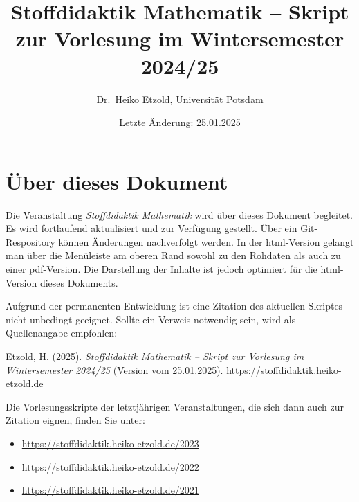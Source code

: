 \documentclass[
]{scrbook}
\title{Stoffdidaktik Mathematik -- Skript zur Vorlesung im Wintersemester 2024/25}
\author{Dr.~Heiko Etzold, Universität Potsdam}
\date{Letzte Änderung: 25.01.2025}
\makeatletter
\providecommand{\tightlist}{%
  \setlength{\itemsep}{0pt}\setlength{\parskip}{0pt}}
\renewenvironment{quote}{
  \list{}{
	\leftmargin0.2cm   %
    \rightmargin\leftmargin
      	\def\FrameCommand
    {%
        {\color{quoteColor}\vrule width 2pt}%
        \hspace{0pt}%
    }%
    \MakeFramed{\advance \hsize -\width \FrameRestore}    \color{quoteColor}
    }
  \item\relax
}
{\endlist\color{black}\endMakeFramed}
\def\renewtheorem#1{%
  \expandafter\let\csname#1\endcsname\relax
  \expandafter\let\csname c@#1\endcsname\relax
  \gdef\renewtheorem@envname{#1}
  \renewtheorem@secpar
}
\def\renewtheorem@secpar{\@ifnextchar[{\renewtheorem@numberedlike}{\renewtheorem@nonumberedlike}}
\def\renewtheorem@numberedlike[#1]#2{\newtheorem{\renewtheorem@envname}[#1]{#2}}
\def\renewtheorem@nonumberedlike#1{
\def\renewtheorem@caption{#1}
\edef\renewtheorem@nowithin{\noexpand\newtheorem{\renewtheorem@envname}{\renewtheorem@caption}}
\renewtheorem@thirdpar
}
\def\renewtheorem@thirdpar{\@ifnextchar[{\renewtheorem@within}{\renewtheorem@nowithin}}
\def\renewtheorem@within[#1]{\renewtheorem@nowithin[#1]}
\theoremstyle{definition}
\theoremstyle{definition}
\theoremstyle{definition}
\theoremstyle{definition}
\theoremstyle{remark}
\makeatother
\begin{document}
\maketitle

%

{
\hypersetup{linkcolor=}
\setcounter{tocdepth}{1}
\tableofcontents
}
\chapter*{Über dieses Dokument}\label{uxfcber-dieses-dokument}

Die Veranstaltung \emph{Stoffdidaktik Mathematik} wird über dieses Dokument begleitet. Es wird fortlaufend aktualisiert und zur Verfügung gestellt. Über ein Git-Respository können Änderungen nachverfolgt werden.
In der html-Version gelangt man über die Menüleiste am oberen Rand sowohl zu den Rohdaten als auch zu einer pdf-Version. Die Darstellung der Inhalte ist jedoch optimiert für die html-Version dieses Dokuments.

Aufgrund der permanenten Entwicklung ist eine Zitation des aktuellen Skriptes nicht unbedingt geeignet. Sollte ein Verweis notwendig sein, wird als Quellenangabe empfohlen:

\begin{quote}
Etzold, H. (2025). \emph{Stoffdidaktik Mathematik -- Skript zur Vorlesung im Wintersemester 2024/25} (Version vom 25.01.2025). \url{https://stoffdidaktik.heiko-etzold.de}
\end{quote}

Die Vorlesungsskripte der letztjährigen Veranstaltungen, die sich dann auch zur Zitation eignen, finden Sie unter:

\begin{itemize}
\tightlist
\item
  \url{https://stoffdidaktik.heiko-etzold.de/2023}
\item
  \url{https://stoffdidaktik.heiko-etzold.de/2022}
\item
  \url{https://stoffdidaktik.heiko-etzold.de/2021}
\end{itemize}
\end{document}
